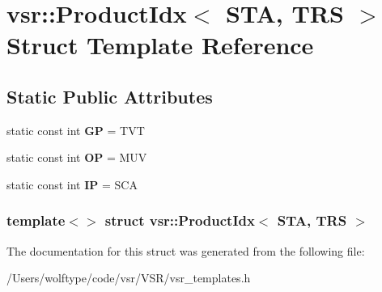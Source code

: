 \hypertarget{structvsr_1_1_product_idx_3_01_s_t_a_00_01_t_r_s_01_4}{\section{vsr\-:\-:Product\-Idx$<$ S\-T\-A, T\-R\-S $>$ Struct Template Reference}
\label{structvsr_1_1_product_idx_3_01_s_t_a_00_01_t_r_s_01_4}
}
\subsection*{Static Public Attributes}
\begin{DoxyCompactItemize}
\item 
\hypertarget{structvsr_1_1_product_idx_3_01_s_t_a_00_01_t_r_s_01_4_a8bac2fbf63ef007406ffaca3abbdd906}{static const int {\bfseries G\-P} = T\-V\-T}\label{structvsr_1_1_product_idx_3_01_s_t_a_00_01_t_r_s_01_4_a8bac2fbf63ef007406ffaca3abbdd906}

\item 
\hypertarget{structvsr_1_1_product_idx_3_01_s_t_a_00_01_t_r_s_01_4_a1bcd751ba744c13867882d737fd4e5d2}{static const int {\bfseries O\-P} = M\-U\-V}\label{structvsr_1_1_product_idx_3_01_s_t_a_00_01_t_r_s_01_4_a1bcd751ba744c13867882d737fd4e5d2}

\item 
\hypertarget{structvsr_1_1_product_idx_3_01_s_t_a_00_01_t_r_s_01_4_a16a0694ddcb7b5d16b3aef249de446c7}{static const int {\bfseries I\-P} = S\-C\-A}\label{structvsr_1_1_product_idx_3_01_s_t_a_00_01_t_r_s_01_4_a16a0694ddcb7b5d16b3aef249de446c7}

\end{DoxyCompactItemize}
\subsubsection*{template$<$$>$ struct vsr\-::\-Product\-Idx$<$ S\-T\-A, T\-R\-S $>$}



The documentation for this struct was generated from the following file\-:\begin{DoxyCompactItemize}
\item 
/\-Users/wolftype/code/vsr/\-V\-S\-R/vsr\-\_\-templates.\-h\end{DoxyCompactItemize}
